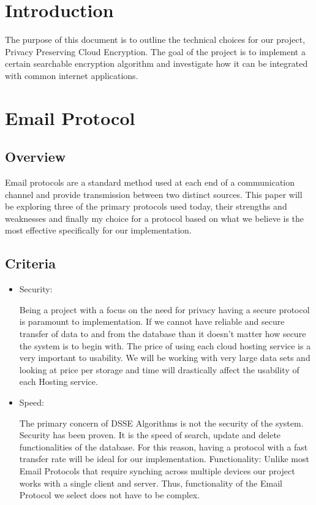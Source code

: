 \documentclass[onecolumn, draftclsnofoot,10pt, compsoc]{IEEEtran}
\begin{document}
\section{ Introduction }

The purpose of this document is to outline the technical choices for our project, Privacy Preserving Cloud Encryption. The goal of the project is to implement a certain searchable encryption algorithm and investigate how it can be integrated with common internet applications.


\section{ Email Protocol }

\subsection{ Overview }

Email protocols are a standard method used at each end of a communication channel and provide transmission between two distinct sources. This paper will be exploring three of the primary protocols used today, their strengths and weaknesses and finally my choice for a protocol based on what we believe is the most effective specifically for our implementation.
\subsection{ Criteria }

\begin{itemize}
  \item Security:
  
Being a project with a focus on the need for privacy having a secure protocol is paramount to implementation. If we cannot have reliable and secure transfer of data to and from the database than it doesn’t matter how secure the system is to begin with.
The price of using each cloud hosting service is a very important to usability. We will be working with very large data sets and looking at price per storage and time will drastically affect the usability of each Hosting service.

  \item Speed:
  
The primary concern of DSSE Algorithms is not the security of the system. Security has been proven. It is the speed of search, update and delete functionalities of the database. For this reason, having a protocol with a fast transfer rate will be ideal for our implementation.
Functionality: Unlike most Email Protocols that require synching across multiple devices our project works with a single client and server. Thus, functionality of the Email Protocol we select does not have to be complex.

\end{itemize}
\end{document}
